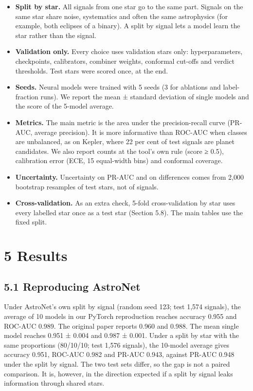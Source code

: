 \documentclass[
]{article}
\providecommand{\tightlist}{%
  \setlength{\itemsep}{0pt}\setlength{\parskip}{0pt}}
\begin{document}
\begin{itemize}
\tightlist
\item
  \textbf{Split by star.} All signals from one star go to the same part.
  Signals on the same star share noise, systematics and often the same
  astrophysics (for example, both eclipses of a binary). A split by
  signal lets a model learn the star rather than the signal.
\item
  \textbf{Validation only.} Every choice uses validation stars only:
  hyperparameters, checkpoints, calibrators, combiner weights, conformal
  cut-offs and verdict thresholds. Test stars were scored once, at the
  end.
\item
  \textbf{Seeds.} Neural models were trained with 5 seeds (3 for
  ablations and label-fraction runs). We report the mean ± standard
  deviation of single models and the score of the 5-model average.
\item
  \textbf{Metrics.} The main metric is the area under the
  precision-recall curve (PR-AUC, average precision). It is more
  informative than ROC-AUC when classes are unbalanced, as on Kepler,
  where 22 per cent of test signals are planet candidates. We also
  report counts at the tool's own rule (score ≥ 0.5), calibration error
  (ECE, 15 equal-width bins) and conformal coverage.
\item
  \textbf{Uncertainty.} Uncertainty on PR-AUC and on differences comes
  from 2,000 bootstrap resamples of test stars, not of signals.
\item
  \textbf{Cross-validation.} As an extra check, 5-fold cross-validation
  by star uses every labelled star once as a test star (Section 5.8).
  The main tables use the fixed split.
\end{itemize}

\hypertarget{results}{%
\section{5 Results}\label{results}}

\hypertarget{reproducing-astronet}{%
\subsection{5.1 Reproducing AstroNet}\label{reproducing-astronet}}

Under AstroNet's own split by signal (random seed 123; test 1,574
signals), the average of 10 models in our PyTorch reproduction reaches
accuracy 0.955 and ROC-AUC 0.989. The original paper reports 0.960 and
0.988. The mean single model reaches 0.951 ± 0.004 and 0.987 ± 0.001.
Under a split by star with the same proportions (80/10/10; test 1,576
signals), the 10-model average gives accuracy 0.951, ROC-AUC 0.982 and
PR-AUC 0.943, against PR-AUC 0.948 under the split by signal. The two
test sets differ, so the gap is not a paired comparison. It is, however,
in the direction expected if a split by signal leaks information through
shared stars.
\end{document}
